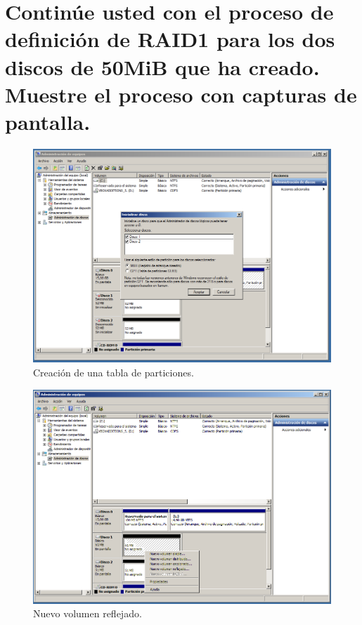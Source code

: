 \documentclass[a4paper,titlepage,12pt]{scrartcl}	%
\numberwithin{figure}{section} %
\numberwithin{table}{section} %
\begin{document}
	
	\section[Continúe usted con el proceso de definición de RAID1 para los dos discos de 50MiB que ha creado. Muestre el proceso con capturas de	pantalla.]{Continúe usted con el proceso de definición de RAID1 para los dos discos de 50MiB que ha creado. Muestre el proceso con capturas de	pantalla.}
	
	\begin{figure}[H]
		\centering
		\includegraphics[scale=0.31]{./Imagenes/WSRAIDPaso1.png}
		\caption[Creación de una tabla de particiones.]{Creación de una tabla de particiones.}
		\label{WSRAIDPaso1}
	\end{figure}
	
	\begin{figure}[H]
		\centering
		\includegraphics[scale=0.31]{./Imagenes/WSRAIDPaso2.png}
		\caption[Nuevo volumen reflejado.]{Nuevo volumen reflejado.}
		\label{WSRAIDPaso2}
	\end{figure}
		
\end{document}
